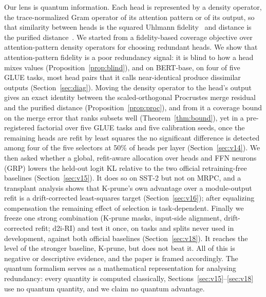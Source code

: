\documentclass[11pt]{article}
\begin{document}
Our lens is quantum information. Each head is represented by a density operator, the trace-normalized Gram operator of its
attention pattern or of its output, so that similarity between heads is the squared Uhlmann
fidelity~\citep{uhlmann1976transition,jozsa1994fidelity} and distance is the purified distance~\citep{tomamichel2010duality}.
We started from a fidelity-based coverage objective over attention-pattern density operators for choosing redundant heads.
We show that attention-pattern fidelity is a poor redundancy signal: it is
blind to how a head mixes values (Proposition~\ref{prop:blind}), and on BERT-base, on four of five GLUE tasks, most
head pairs that it calls near-identical produce dissimilar outputs (Section~\ref{sec:diag}). Moving the density operator to the head's output
gives an exact identity between the scaled-orthogonal Procrustes merge residual and the purified distance
(Proposition~\ref{prop:proc}), and from it a coverage bound on the merge error that ranks subsets well (Theorem~\ref{thm:bound}), yet in a pre-registered
factorial over five GLUE tasks and five calibration seeds, once the remaining heads are refit by least squares the
no significant difference is detected among four of the five selectors at 50\% of heads per layer (Section~\ref{sec:v14}). We then asked whether a global,
refit-aware allocation over heads and FFN neurons (GRP) lowers the held-out logit KL relative to the two official retraining-free baselines
(Section~\ref{sec:v15}). It does so on SST-2 but not on MRPC, and a transplant analysis shows that K-prune's own
advantage over a module-output refit is a drift-corrected least-squares target (Section~\ref{sec:v16}); after
equalizing compensation the remaining effect of selection is task-dependent. Finally we freeze one strong
combination (K-prune masks, input-side alignment, drift-corrected refit; d2i-RI) and test it once, on tasks and splits never used in
development, against both official baselines (Section~\ref{sec:v18}). It reaches the level of the stronger baseline, K-prune, but does not beat it.
All of this is negative or descriptive evidence, and the paper is framed accordingly. The quantum formalism serves as a
mathematical representation for analysing redundancy: every quantity is computed classically,
Sections~\ref{sec:v15}--\ref{sec:v18} use no quantum quantity, and we claim no quantum advantage.
\end{document}
